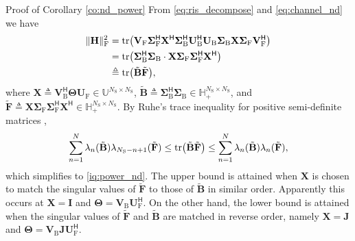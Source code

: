\documentclass[journal]{IEEEtran}
\begin{document}
\begin{appendix}
	\begin{subsection}{Proof of Corollary \ref{co:nd_power}}
		\label{ap:nd_power}
		From \eqref{eq:ris_decompose} and \eqref{eq:channel_nd} we have
		\begin{equation}
			\begin{split}
				\lVert \mathbf{H} \rVert _\mathrm{F}^2
				& = \operatorname{tr} \bigl(\mathbf{V}_\mathrm{F} \mathbf{\Sigma}_\mathrm{F}^\mathsf{H} \mathbf{X}^\mathsf{H} \mathbf{\Sigma}_\mathrm{B}^\mathsf{H} \mathbf{U}_\mathrm{B}^\mathsf{H} \mathbf{U}_\mathrm{B} \mathbf{\Sigma}_\mathrm{B} \mathbf{X} \mathbf{\Sigma}_\mathrm{F} \mathbf{V}_\mathrm{F}^\mathsf{H}\bigr) \\
				& = \operatorname{tr} \bigl(\mathbf{\Sigma}_\mathrm{B}^\mathsf{H} \mathbf{\Sigma}_\mathrm{B} \cdot \mathbf{X} \mathbf{\Sigma}_\mathrm{F} \mathbf{\Sigma}_\mathrm{F}^\mathsf{H} \mathbf{X}^\mathsf{H}\bigr)                                                                                                         \\
				& \triangleq \operatorname{tr} \bigl(\tilde{\mathbf{B}} \tilde{\mathbf{F}}\bigr),
			\end{split}
		\end{equation}
		where $\mathbf{X} \triangleq \mathbf{V}_\mathrm{B}^\mathsf{H} \mathbf{\Theta} \mathbf{U}_\mathrm{F} \in \mathbb{U}^{N_\mathrm{S} \times N_\mathrm{S}}$, $\tilde{\mathbf{B}} \triangleq \mathbf{\Sigma}_\mathrm{B}^\mathsf{H} \mathbf{\Sigma}_\mathrm{B} \in \mathbb{H}_+^{N_\mathrm{S} \times N_\mathrm{S}}$, and $\tilde{\mathbf{F}} \triangleq \mathbf{X} \mathbf{\Sigma}_\mathrm{F} \mathbf{\Sigma}_\mathrm{F}^\mathsf{H} \mathbf{X}^\mathsf{H} \in \mathbb{H}_+^{N_\mathrm{S} \times N_\mathrm{S}}$.
		By Ruhe's trace inequality for positive semi-definite matrices \cite[(H.1.g) and (H.1.h)]{Marshall2010},
		\begin{equation*}
			\sum_{n=1}^N \lambda_n(\tilde{\mathbf{B}}) \lambda_{N_\mathrm{S}-n+1}(\tilde{\mathbf{F}}) \le \operatorname{tr} \bigl(\tilde{\mathbf{B}} \tilde{\mathbf{F}}\bigr) \le \sum_{n=1}^N \lambda_n(\tilde{\mathbf{B}}) \lambda_n(\tilde{\mathbf{F}}),
		\end{equation*}
		which simplifies to \eqref{iq:power_nd}.
		The upper bound is attained when $\mathbf{X}$ is chosen to match the singular values of $\tilde{\mathbf{F}}$ to those of $\tilde{\mathbf{B}}$ in similar order.
		Apparently this occurs at $\mathbf{X} = \mathbf{I}$ and $\mathbf{\Theta} = \mathbf{V}_\mathrm{B} \mathbf{U}_\mathrm{F}^\mathsf{H}$.
		On the other hand, the lower bound is attained when the singular values of $\tilde{\mathbf{F}}$ and $\tilde{\mathbf{B}}$ are matched in reverse order, namely $\mathbf{X} = \mathbf{J}$ and $\mathbf{\Theta} = \mathbf{V}_\mathrm{B} \mathbf{J} \mathbf{U}_\mathrm{F}^\mathsf{H}$.
	\end{subsection}


\end{appendix}
\end{document}

